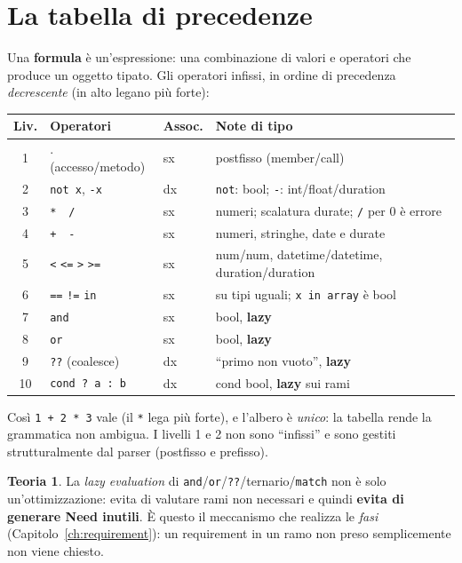 \documentclass[11pt,a4paper]{book}
\let\code\lstinline
\newcommand{\ic}[1]{{\ttfamily #1}}
\theoremstyle{definition}
\newtheorem*{teoria}{Teoria}
\begin{document}
{{{{\section{La tabella di precedenze}

Una \textbf{formula} è un'espressione: una combinazione di valori e operatori che
produce un oggetto tipato. Gli operatori infissi, in ordine di precedenza
\emph{decrescente} (in alto legano più forte):

\begin{center}
\small
\begin{tabular}{@{}c l l p{6.2cm}@{}}
\toprule
\textbf{Liv.} & \textbf{Operatori} & \textbf{Assoc.} & \textbf{Note di tipo} \\
\midrule
1 & \ic{.} (accesso/metodo) & sx & postfisso (member/call) \\
2 & \code|not x|, \code|-x| & dx & \code|not|: bool; \code|-|: int/float/duration \\
3 & \code|*|\ \ \code|/| & sx & numeri; scalatura durate; \code|/| per 0 è errore \\
4 & \code|+|\ \ \code|-| & sx & numeri, stringhe, date e durate \\
5 & \code|<| \code|<=| \code|>| \code|>=| & sx & num/num, datetime/datetime, duration/duration \\
6 & \code|==| \code|!=| \code|in| & sx & su tipi uguali; \code|x in array| è bool \\
7 & \code|and| & sx & bool, \textbf{lazy} \\
8 & \code|or| & sx & bool, \textbf{lazy} \\
9 & \code|??| (coalesce) & dx & ``primo non vuoto'', \textbf{lazy} \\
10 & \code|cond ? a : b| & dx & \ic{cond} bool, \textbf{lazy} sui rami \\
\bottomrule
\end{tabular}
\end{center}

Così \code|1 + 2 * 3| vale \ic{7} (il \code|*| lega più forte), e l'albero è
\emph{unico}: la tabella rende la grammatica non ambigua. I livelli 1 e 2 non sono
``infissi'' e sono gestiti strutturalmente dal parser (postfisso e prefisso).

\begin{teoria}
La \emph{lazy evaluation} di \code|and|/\code|or|/\code|??|/ternario/\code|match|
non è solo un'ottimizzazione: evita di valutare rami non necessari e quindi
\textbf{evita di generare \ic{Need} inutili}. È questo il meccanismo che realizza
le \emph{fasi} (Capitolo~\ref{ch:requirement}): un requirement in un ramo non
preso semplicemente non viene chiesto.
\end{teoria}

}}}}
\end{document}
